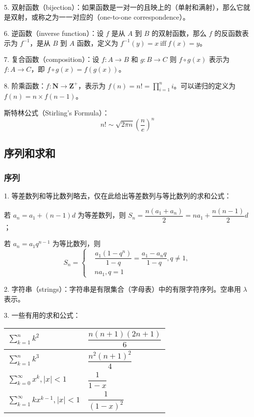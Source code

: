\documentclass[normal,cyan]{elegantnote}
\begin{document}
5. 双射函数（bijection）：如果函数是一对一的且映上的（单射和满射），那么它就是双射，或称之为一一对应的（one-to-one correspondence）。

6. 逆函数（inverse function）：设 $f$ 是从 $A$ 到 $B$ 的双射函数，那么 $f$ 的反函数表示为 $f^{-1}$，是从 $B$ 到 $A$ 函数，定义为 $f^{-1}(y) = x\ \text{iff}\  f(x) = y$。

7. 复合函数（composition）：设 $f:A \to B$ 和 $g:B \to C$ 则 $f \circ g(x)$ 表示为 $f:A \to C$，即 $f \circ g(x) = f(g(x))$。

8. 阶乘函数：$f: \mathbf{N} \to \mathbf{Z}^+$，表示为 $f(n) = n! = \prod\limits_{i = 1}^n i$。可以递归的定义为 $f(n) = n \times f(n - 1)$。
\begin{note}
    斯特林公式（Stirling's Formula）：$$ n! \sim \sqrt{2 \pi n}\left(\dfrac ne\right)^n$$
\end{note}

\subsection{序列和求和}
\subsubsection{序列}
1. 等差数列和等比数列略去，仅在此给出等差数列与等比数列的求和公式：

若 $a_n = a_1 + (n - 1)d$ 为等差数列，则 $S_n = \dfrac{n(a_1 + a_n)}{2} = na_1 + \dfrac{n(n - 1)}{2}d$；

若 $a_n = a_1 q^{n - 1}$ 为等比数列，则 \begin{equation}\nonumber
    S_n = \left\{  \begin{aligned}&\dfrac{a_1(1 - q^n)}{1 - q} = \dfrac{a_1 - a_n q}{1 - q}, q \neq 1,\\
    &na_1, q = 1 \end{aligned}\right.
\end{equation}

2. 字符串（strings）：字符串是有限集合（字母表）中的有限字符序列。空串用 $\lambda$ 表示。

3. 一些有用的求和公式：
\begin{table}[htbp]\centering
    \begin{tabular}{|l|l|}
    \hline
    $\sum\limits_{k = 1}^n k^2$                      & $\dfrac{n(n+1)(2n+1)}{6}$ \\ \hline
    $\sum\limits_{k = 1}^n k^3$                      & $\dfrac{n^2(n+1)^2}{4}$   \\ \hline
    $\sum\limits_{k = 0}^{\infty} x^k, |x| < 1$      & $\dfrac{1}{1 - x}$        \\ \hline
    $\sum\limits_{k = 1}^{\infty}kx^{k - 1},|x| < 1$ & $\dfrac{1}{(1 - x)^2}$    \\ \hline
    \end{tabular}
\end{table}
\end{document}
